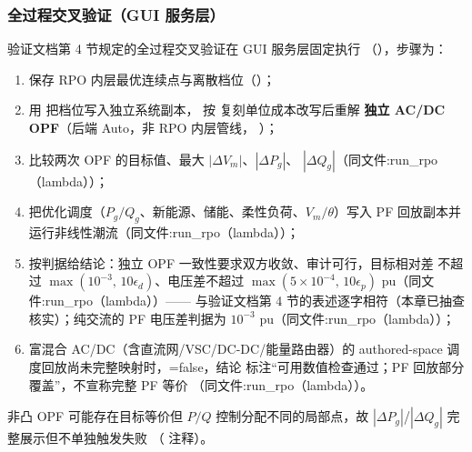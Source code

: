 \subsubsection*{全过程交叉验证（GUI 服务层）}
验证文档第 4 节规定的全过程交叉验证在 GUI 服务层固定执行
（），步骤为：
\begin{enumerate}
  \item 保存 RPO 内层最优连续点与离散档位（）；
  \item 用  把档位写入独立系统副本，
        按  复刻单位成本改写后重解
        \textbf{独立 AC/DC OPF}（后端 Auto，非 RPO 内层管线，
        ）；
  \item 比较两次 OPF 的目标值、最大 $|\Delta V_m|$、$|\Delta P_g|$、
        $|\Delta Q_g|$（同文件:run\_rpo（lambda））；
  \item 把优化调度（$P_g/Q_g$、新能源、储能、柔性负荷、$V_m/\theta$）写入
        PF 回放副本并运行非线性潮流（同文件:run\_rpo（lambda））；
  \item 按判据给结论：独立 OPF 一致性要求双方收敛、审计可行，目标相对差
        不超过 $\max(10^{-3},\,10\epsilon_d)$、电压差不超过
        $\max(5\times10^{-4},\,10\epsilon_p)$ pu（同文件:run\_rpo（lambda））——
        与验证文档第 4 节的表述逐字相符（本章已抽查核实）；纯交流的 PF
        电压差判据为 $10^{-3}$ pu（同文件:run\_rpo（lambda））；
  \item 富混合 AC/DC（含直流网/VSC/DC-DC/能量路由器）的 authored-space
        调度回放尚未完整映射时，=false，结论
        标注“可用数值检查通过；PF 回放部分覆盖”，不宣称完整 PF 等价
        （同文件:run\_rpo（lambda））。
\end{enumerate}
非凸 OPF 可能存在目标等价但 $P/Q$ 控制分配不同的局部点，故
$|\Delta P_g|$/$|\Delta Q_g|$ 完整展示但不单独触发失败
（ 注释）。

